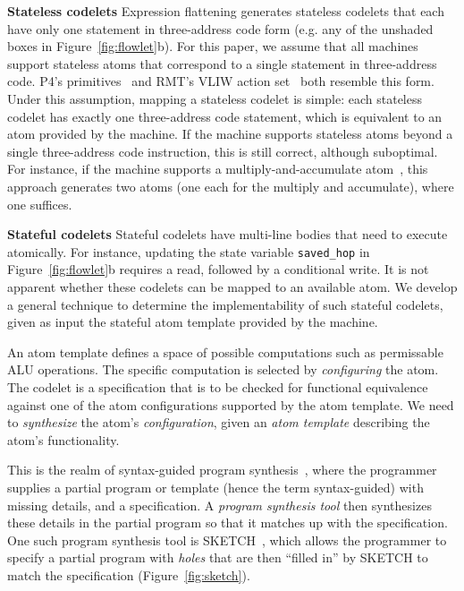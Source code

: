 \textbf{Stateless codelets}
Expression flattening generates stateless codelets that each have only one
statement in three-address code form (e.g. any of the unshaded boxes in
Figure~\ref{fig:flowlet}b). For this paper, we assume that all \absmachine
machines support stateless atoms that correspond to a single statement in
three-address code. P4's primitives~\cite{p4spec} and RMT's VLIW action
set~\cite{rmt} both resemble this form. Under this assumption, mapping a
stateless codelet is simple: each stateless codelet has exactly one
three-address code statement, which is equivalent to an atom provided by the
\absmachine machine. If the \absmachine machine supports stateless atoms beyond
a single three-address code instruction, this is still correct, although
suboptimal. For instance, if the \absmachine machine supports a
multiply-and-accumulate atom~\cite{mac}, this approach generates two atoms (one
each for the multiply and accumulate), where one suffices.

\textbf{Stateful codelets}
Stateful codelets have multi-line bodies that need to execute atomically. For
instance, updating the state variable \texttt{saved\_hop} in
Figure~\ref{fig:flowlet}b requires a read, followed by a conditional write.  It
is not apparent whether these codelets can be mapped to an available atom. We
develop a general technique to determine the implementability of such stateful
codelets, given as input the stateful atom template provided by the \absmachine
machine.

An atom template defines a space of possible computations such as
permissable ALU operations.  The specific computation is selected by
\textit{configuring} the atom. The codelet is a specification that is to be
checked for functional equivalence against one of the atom configurations
supported by the atom template. We need to \textit{synthesize} the atom's
\textit{configuration}, given an \textit{atom template} describing the atom's
functionality.

This is the realm of syntax-guided program synthesis~\cite{sgsyn}, where the
programmer supplies a partial program or template (hence the term
syntax-guided) with missing details, and a specification. A \textit{program
synthesis tool} then synthesizes these details in the partial program so that
it matches up with the specification. One such program synthesis tool is
SKETCH~\cite{bitstreaming, sketch_asplos, sketch_manual}, which allows the
programmer to specify a partial program with \textit{holes} that are then
``filled in'' by SKETCH to match the specification (Figure~\ref{fig:sketch}).

